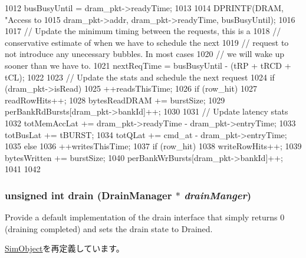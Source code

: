 \begin{DoxyCode}
{1012     busBusyUntil = dram_pkt->readyTime;
1013 
1014     DPRINTF(DRAM, "Access to %
1015             dram_pkt->addr, dram_pkt->readyTime, busBusyUntil);
1016 
1017     // Update the minimum timing between the requests, this is a
1018     // conservative estimate of when we have to schedule the next
1019     // request to not introduce any unecessary bubbles. In most cases
1020     // we will wake up sooner than we have to.
1021     nextReqTime = busBusyUntil - (tRP + tRCD + tCL);
1022 
1023     // Update the stats and schedule the next request
1024     if (dram_pkt->isRead) {
1025         ++readsThisTime;
1026         if (row_hit)
1027             readRowHits++;
1028         bytesReadDRAM += burstSize;
1029         perBankRdBursts[dram_pkt->bankId]++;
1030 
1031         // Update latency stats
1032         totMemAccLat += dram_pkt->readyTime - dram_pkt->entryTime;
1033         totBusLat += tBURST;
1034         totQLat += cmd_at - dram_pkt->entryTime;
1035     } else {
1036         ++writesThisTime;
1037         if (row_hit)
1038             writeRowHits++;
1039         bytesWritten += burstSize;
1040         perBankWrBursts[dram_pkt->bankId]++;
1041     }
1042 }
\end{DoxyCode}
\hypertarget{classDRAMCtrl_aa8a18d230dba7a674ac8a0b4f35bc36a}{
\subsubsection[{drain}]{\setlength{\rightskip}{0pt plus 5cm}unsigned int drain ({\bf DrainManager} $\ast$ {\em drainManger})}}
\label{classDRAMCtrl_aa8a18d230dba7a674ac8a0b4f35bc36a}
Provide a default implementation of the drain interface that simply returns 0 (draining completed) and sets the drain state to Drained. 

\hyperlink{classSimObject_a6bf479c521c7c3eb473822d953275b26}{SimObject}を再定義しています。



